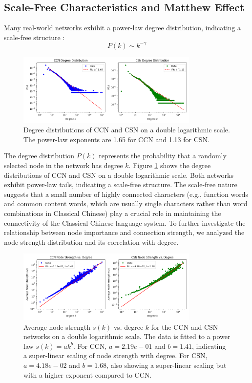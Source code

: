 \documentclass[11pt]{article}
\begin{document}
\subsection{Scale-Free Characteristics and Matthew Effect}
Many real-world networks exhibit a power-law degree distribution, indicating a scale-free structure \cite{barabasi1999emergence}:
\begin{equation}
P(k) \sim k^{-\gamma}
\end{equation}
\begin{figure}[htbp]
    \centering
    \includegraphics[width=0.8\textwidth]{../analysis/degree distribution/degree distribution.png}
    \caption{Degree distributions of CCN and CSN on a double logarithmic scale. The power-law exponents are 1.65 for CCN and 1.13 for CSN.}
    \label{fig:degree_dist}
    \end{figure}
    The degree distribution $P(k)$ represents the probability that a randomly selected node in the network has degree $k$. Figure \ref{fig:degree_dist} shows the degree distributions of CCN and CSN on a double logarithmic scale. Both networks exhibit power-law tails, indicating a scale-free structure.
    The scale-free nature suggests that a small number of highly connected characters (e.g., function words and common content words, which are usually single characters rather than word combinations in Classical Chinese) play a crucial role in maintaining the connectivity of the Classical Chinese language system.
    To further investigate the relationship between node importance and connection strength, we analyzed the node strength distribution and its correlation with degree.
\begin{figure}[htbp]
    \centering
    \includegraphics[width=0.8\textwidth]{../analysis/node strength/node strenth.png}
    \caption{Average node strength $s(k)$ vs. degree $k$ for the CCN and CSN networks on a double logarithmic scale. The data is fitted to a power law $s(k) = ak^b$. For CCN, $a=2.19e-01$ and $b=1.41$, indicating a super-linear scaling of node strength with degree. For CSN, $a=4.18e-02$ and $b=1.68$, also showing a super-linear scaling but with a higher exponent compared to CCN.}
    \label{fig:strength_dist}
    \end{figure}
\end{document}
